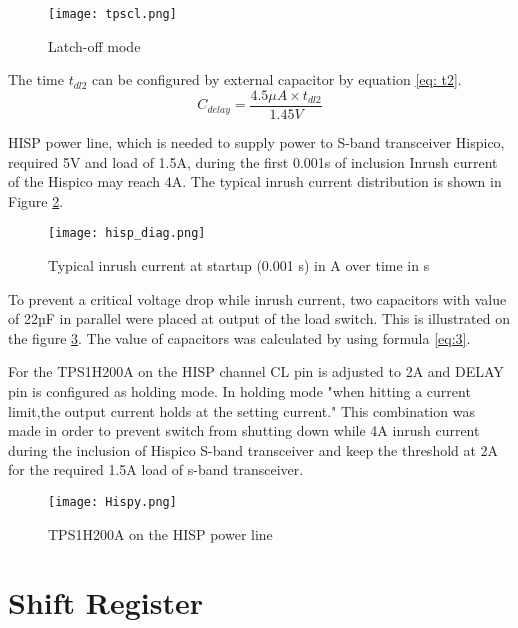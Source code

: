 \begin{figure}[h]
	\centering
	\texttt{[image: tpscl.png]}
	\caption{Latch-off mode}
	\label{fig: tpscl}
\end{figure} 

The time $t_{dl2}$ can be configured by external capacitor by equation \ref{eq: t2}.  \\

\begin{equation} \label{eq: t2}
C_{delay} = \frac{4.5\mu A \times t_{dl2}}{1.45V} 
\end{equation}



 HISP power line, which is needed to supply power to S-band transceiver Hispico, required 5V and load of 1.5A, during the first 0.001s of inclusion Inrush current of the Hispico may reach 4A. The typical inrush current distribution is shown in Figure \ref{fig: hisp_inr}.

\begin{figure}[h]
	\centering
	\texttt{[image: hisp\_diag.png]}
	\caption{Typical inrush current at startup (0.001 s) in A over time in s}
	\label{fig: hisp_inr}
\end{figure} 

To prevent a critical voltage drop while inrush current, two capacitors with value of 22µF in parallel were placed at output of the load switch. This is illustrated on the figure \ref{fig: hispico}. The value of capacitors was calculated by using formula \ref{eq:3}.

For the TPS1H200A on the HISP channel CL pin is adjusted to 2A and DELAY pin is configured as holding mode. In holding mode \cite{28}"when hitting a current limit,the output current holds at the setting current." This combination was made in order to prevent switch from shutting down while 4A inrush current during the inclusion of Hispico S-band transceiver and keep the threshold at 2A for the required 1.5A load of s-band transceiver. 
 


\begin{figure}[h]
	\centering
	\texttt{[image: Hispy.png]}
	\caption{TPS1H200A on the HISP power line}
	\label{fig: hispico}
\end{figure}



 
\section{Shift Register}\label{shiftty}

